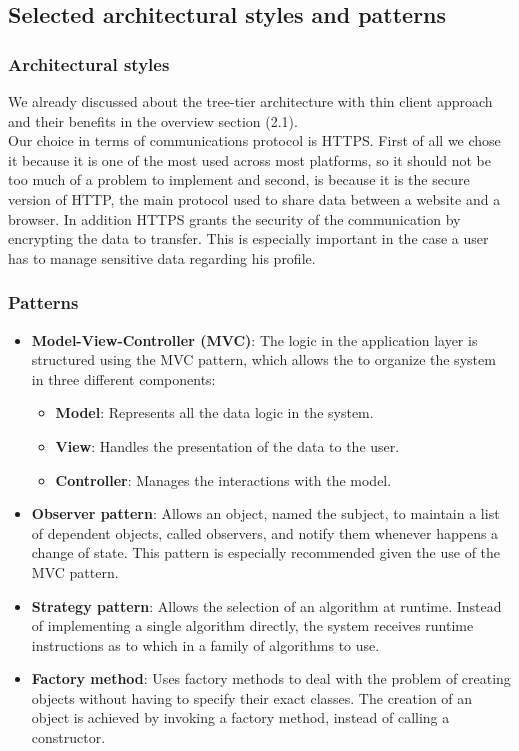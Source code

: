 \documentclass[11pt,twoside]{article}
\begin{document}
	\subsection{Selected architectural styles and patterns}
		\subsubsection{Architectural styles}
We already discussed about the tree-tier architecture with thin client approach and their benefits in the overview section (2.1).\\
Our choice in terms of communications protocol is HTTPS. First of all we chose it because it is one of the most used across most platforms, so it should not be too much of a problem to implement and second, is because it is the secure version of HTTP, the main protocol used to share data between a website and a browser. In addition HTTPS grants the security of the communication by encrypting the data to transfer. This is especially important in the case a user has to manage sensitive data regarding his profile.

		\subsubsection{Patterns}
\begin{itemize}
\item \textbf{Model-View-Controller (MVC)}: The logic in the application layer is structured using the MVC pattern, which allows the to organize the system in three different components:
	\begin{itemize}
	\item \textbf{Model}: Represents all the data logic in the system.
	\item \textbf{View}: Handles the presentation of the data to the user.
	\item \textbf{Controller}: Manages the interactions with the model.
	\end{itemize}
\item \textbf{Observer pattern}: Allows an object, named the subject, to maintain a list of dependent objects, called observers, and notify them whenever happens a change of state. This pattern is especially recommended given the use of the MVC pattern.
\item \textbf{Strategy pattern}: Allows the selection of an algorithm at runtime. Instead of implementing a single algorithm directly, the system receives runtime instructions as to which in a family of algorithms to use.
\item \textbf{Factory method}: Uses factory methods to deal with the problem of creating objects without having to specify their exact classes. The creation of an object is achieved by invoking a factory method, instead of calling a constructor.
\end{itemize}
	
\end{document}
